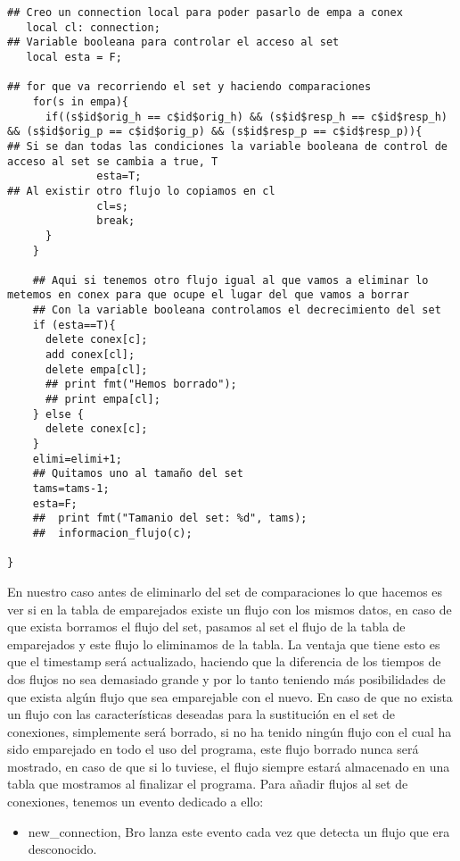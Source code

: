 \begin{verbatim}
## Creo un connection local para poder pasarlo de empa a conex
   local cl: connection;
## Variable booleana para controlar el acceso al set
   local esta = F;

## for que va recorriendo el set y haciendo comparaciones
    for(s in empa){
      if((s$id$orig_h == c$id$orig_h) && (s$id$resp_h == c$id$resp_h) && (s$id$orig_p == c$id$orig_p) && (s$id$resp_p == c$id$resp_p)){
## Si se dan todas las condiciones la variable booleana de control de acceso al set se cambia a true, T
              esta=T;
## Al existir otro flujo lo copiamos en cl
              cl=s;
              break;
      }
    }

    ## Aqui si tenemos otro flujo igual al que vamos a eliminar lo metemos en conex para que ocupe el lugar del que vamos a borrar
    ## Con la variable booleana controlamos el decrecimiento del set
    if (esta==T){
      delete conex[c];
      add conex[cl];
      delete empa[cl];
      ## print fmt("Hemos borrado");
      ## print empa[cl];
    } else {
      delete conex[c];
    }
    elimi=elimi+1;
    ## Quitamos uno al tamaño del set
    tams=tams-1;
    esta=F;
    ##  print fmt("Tamanio del set: %d", tams);
    ##  informacion_flujo(c);

}
\end{verbatim}

En nuestro caso antes de eliminarlo del set de comparaciones 
lo que hacemos es ver si en la tabla de emparejados existe un 
flujo con los mismos datos, en caso de que exista borramos el 
flujo del set, pasamos al set el flujo de la tabla de emparejados 
y este flujo lo eliminamos de la tabla. La ventaja que tiene 
esto es que el timestamp será actualizado, haciendo que la 
diferencia de los tiempos de dos flujos no sea demasiado grande 
y por lo tanto teniendo más posibilidades de que exista algún 
flujo que sea emparejable con el nuevo. En caso de que no exista 
un flujo con las características deseadas para la sustitución en 
el set de conexiones, simplemente será borrado, si no ha tenido 
ningún flujo con el cual ha sido emparejado en todo el uso del 
programa, este flujo borrado nunca será mostrado, en caso de que 
si lo tuviese, el flujo siempre estará almacenado en una tabla 
que mostramos al finalizar el programa.
\intro
Para añadir flujos al set de conexiones, tenemos un evento 
dedicado a ello:
\intro
\begin{itemize}
\item new\_connection, Bro lanza este evento cada vez que detecta un flujo que era desconocido.
\end{itemize}

